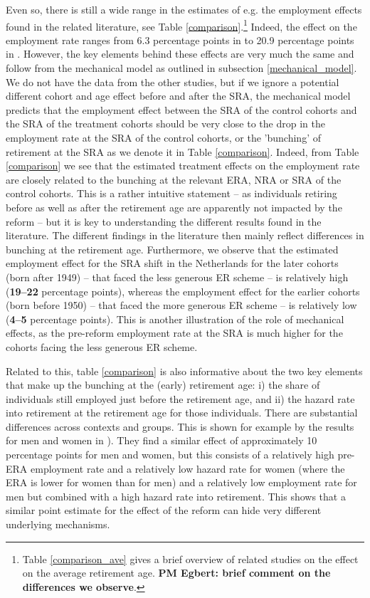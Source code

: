 \documentclass[12pt,a4paper]{article}
\begin{document}
Even so, there is still a wide range in the estimates of e.g. the employment effects found in the related literature, see Table \ref{comparison}.\footnote{Table \ref{comparison_ave} gives a brief overview of related studies on the effect on the average retirement age. \textbf{PM Egbert: brief comment on the differences we observe}.} Indeed, the effect on the employment rate ranges from 6.3 percentage points in \cite{cribb2016signals} to 20.9 percentage points in \cite{rabate_employment_2019}. However, the key elements behind these effects are very much the same and follow from the mechanical model as outlined in subsection \ref{mechanical_model}. We do not have the data from the other studies, but if we ignore a potential different cohort and age effect before and after the SRA, the mechanical model predicts that the employment effect between the SRA of the control cohorts and the SRA of the treatment cohorts should be very close to the drop in the employment rate at the SRA of the control cohorts, or the 'bunching' of retirement at the SRA as we denote it in Table \ref{comparison}.     
Indeed, from Table \ref{comparison} we see that the estimated treatment effects on the employment rate are closely related to the bunching at the relevant ERA, NRA or SRA of the control cohorts. This is a rather intuitive statement -- as individuals retiring before as well as after the retirement age are apparently not impacted by the reform -- but it is key to understanding the different results found in the literature. The different findings in the literature then mainly reflect differences in bunching at the retirement age. Furthermore, we observe that the estimated employment effect for the SRA shift in the Netherlands for the later cohorts (born after 1949) -- that faced the less generous ER scheme -- is relatively high (\textbf{19--22} percentage points), whereas the employment effect for the earlier cohorts (born before 1950) -- that faced the more generous ER scheme -- is relatively low (\textbf{4--5} percentage points). This is another illustration of the role of mechanical effects, as the pre-reform employment rate at the SRA is much higher for the cohorts facing the less generous ER scheme.

Related to this, table \ref{comparison} is also informative about the two key elements that make up the bunching at the (early) retirement age: i) the share of individuals still employed just before the retirement age, and ii) the hazard rate into retirement at the retirement age for those individuals. 
There are substantial differences across contexts and groups. This is shown for example by the results for men and women in \cite{staubli_does_2013}). They find a similar effect of approximately 10 percentage points for men and women, but this consists of a relatively high pre-ERA employment rate and a relatively low
hazard rate for women (where the ERA is lower for women than for men) and a relatively low employment rate for men but combined with a high hazard rate into retirement. This shows that a similar point estimate for the effect of the reform can hide very different underlying mechanisms.
\end{document}
